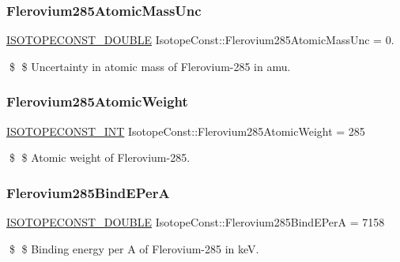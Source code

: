 \subsubsection{\texorpdfstring{Flerovium285\+Atomic\+Mass\+Unc}{Flerovium285AtomicMassUnc}}
{\footnotesize\ttfamily \mbox{\hyperlink{group___isotope_const-_macros_ga8f45a7272ce02c0b4c65c44636ed719a}{I\+S\+O\+T\+O\+P\+E\+C\+O\+N\+S\+T\+\_\+\+D\+O\+U\+B\+LE}} Isotope\+Const\+::\+Flerovium285\+Atomic\+Mass\+Unc = 0.}

\$ \$ Uncertainty in atomic mass of Flerovium-\/285 in amu. \mbox{\label{group___isotope_const-_flerovium-_fl285_ga31467065e6055a495c31b4eb1b031e7a}} 
\subsubsection{\texorpdfstring{Flerovium285\+Atomic\+Weight}{Flerovium285AtomicWeight}}
{\footnotesize\ttfamily \mbox{\hyperlink{group___isotope_const-_macros_ga5f18360b3e99483a35c32d789e62621c}{I\+S\+O\+T\+O\+P\+E\+C\+O\+N\+S\+T\+\_\+\+I\+NT}} Isotope\+Const\+::\+Flerovium285\+Atomic\+Weight = 285}

\$ \$ Atomic weight of Flerovium-\/285. \mbox{\label{group___isotope_const-_flerovium-_fl285_gaafb95ab8f4a21d730ca503cc6e1849c1}} 
\subsubsection{\texorpdfstring{Flerovium285\+Bind\+E\+PerA}{Flerovium285BindEPerA}}
{\footnotesize\ttfamily \mbox{\hyperlink{group___isotope_const-_macros_ga8f45a7272ce02c0b4c65c44636ed719a}{I\+S\+O\+T\+O\+P\+E\+C\+O\+N\+S\+T\+\_\+\+D\+O\+U\+B\+LE}} Isotope\+Const\+::\+Flerovium285\+Bind\+E\+PerA = 7158}

\$ \$ Binding energy per A of Flerovium-\/285 in keV. \mbox{\label{group___isotope_const-_flerovium-_fl285_gabf8b3447cb34ed5723806cada368251f}} 
